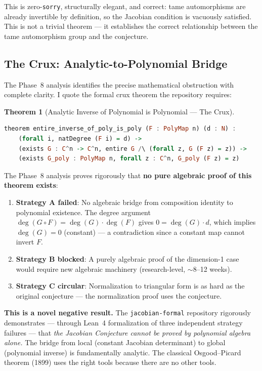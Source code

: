 \documentclass[12pt, letterpaper]{article}
\theoremstyle{plain}
\newtheorem{theorem}{Theorem}[section]
\theoremstyle{definition}
\theoremstyle{remark}
\begin{document}
This is zero-\texttt{sorry}, structurally elegant, and correct: tame automorphisms
are already invertible by definition, so the Jacobian condition is vacuously
satisfied. This is not a trivial theorem --- it establishes the correct relationship
between the tame automorphism group and the conjecture.

\subsection{The Crux: Analytic-to-Polynomial Bridge}

The Phase~8 analysis identifies the precise mathematical obstruction with
complete clarity. I quote the formal crux theorem the repository requires:

\begin{theorem}[Analytic Inverse of Polynomial is Polynomial --- The Crux]
\label{thm:crux}
\begin{lstlisting}[language=Haskell]
theorem entire_inverse_of_poly_is_poly (F : PolyMap n) (d : N) :
    (forall i, natDegree (F i) = d) ->
    (exists G : C^n -> C^n, entire G /\ (forall z, G (F z) = z)) ->
    (exists G_poly : PolyMap n, forall z : C^n, G_poly (F z) = z)
\end{lstlisting}
\end{theorem}

The Phase~8 analysis proves rigorously that \textbf{no pure algebraic proof
of this theorem exists}:
\begin{enumerate}[nosep]
  \item \textbf{Strategy A failed}: No algebraic bridge from composition identity
    to polynomial existence. The degree argument $\deg(G \circ F) = \deg(G) \cdot \deg(F)$
    gives $0 = \deg(G) \cdot d$, which implies $\deg(G) = 0$ (constant) --- a
    contradiction since a constant map cannot invert $F$.
  \item \textbf{Strategy B blocked}: A purely algebraic proof of the dimension-1
    case would require new algebraic machinery (research-level, $\sim 8$--12 weeks).
  \item \textbf{Strategy C circular}: Normalization to triangular form is as hard
    as the original conjecture --- the normalization proof uses the conjecture.
\end{enumerate}

\begin{noveltybox}[title={The Parr Finding: Pure Algebra Cannot Solve the Jacobian Conjecture}]
\textbf{This is a novel negative result.}
The \texttt{jacobian-formal} repository rigorously demonstrates --- through
Lean~4 formalization of three independent strategy failures --- that
\textit{the Jacobian Conjecture cannot be proved by polynomial algebra alone.}
The bridge from local (constant Jacobian determinant) to global (polynomial inverse)
is fundamentally analytic. The classical Osgood--Picard theorem (1899) uses
the right tools because there are no other tools.
\end{noveltybox}
\end{document}
